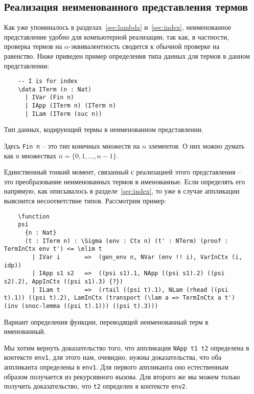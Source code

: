 \subsection{Реализация неименованного представления термов}

Как уже упоминалось в разделах~\ref{sec:lambda} и~\ref{sec:index}, неименованное представление удобно для компьютерной реализации, так как, в частности, проверка термов на $\alpha$-эквивалентность сводится к обычной проверке на равенство. Ниже приведен пример определения типа данных для термов в данном представлении:

\begin{listing}[H]
  \begin{verbatim}
    -- I is for index
    \data ITerm (n : Nat)
      | IVar (Fin n)
      | IApp (ITerm n) (ITerm n)
      | ILam (ITerm (suc n))
  \end{verbatim}
  \caption{Тип данных, кодирующий термы в неименованном представлении.}
\end{listing}

Здесь \texttt{Fin n} -- это тип конечных множеств на $n$ элементов. О них можно думать как о множествах $\overline{n} = \{0,1, \dots, n-1\}$.

Единственный тонкий момент, связанный с реализацией этого представления -- это преобразование неименованных термов в именованные. Если определять его напрямую, как описывалось в разделе~\ref{sec:index}, то уже в случае аппликации выяснится несоответствие типов. Рассмотрим пример:

\begin{listing}[H]
  \begin{verbatim}
    \function
    psi
      {n : Nat}
      (t : ITerm n) : \Sigma (env : Ctx n) (t' : NTerm) (proof : TermInCtx env t') <= \elim t
        | IVar i       =>  (gen_env n, NVar (env !! i), VarInCtx (i, idp))
        | IApp s1 s2   =>  ((psi s1).1, NApp ((psi s1).2) ((psi s2).2), AppInCtx ((psi s1).3) {?})
        | ILam t       =>  (rtail ((psi t).1), NLam (rhead ((psi t).1)) ((psi t).2), LamInCtx (transport (\lam a => TermInCtx a t') (inv (snoc-lemma ((psi t).1))) ((psi t).3)))
  \end{verbatim}
  \caption{Вариант определения функции, переводящей неименованный терм в именованный.}
\end{listing}

Мы хотим вернуть доказательство того, что аппликация \texttt{NApp t1 t2} определена в контексте \texttt{env1}, для этого нам, очевидно, нужны доказательства, что оба аппликанта определены в \texttt{env1}. Для первого аппликанта оно естественным образом получается из рекурсивного вызова. Для второго же мы можем только получить доказательство,  что \texttt{t2}  определен в контексте \texttt{env2}.

